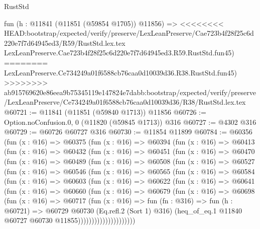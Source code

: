 \begin{lexlean}{RustStd}
\begin{coremodule}
{\begin{coremodule}
{{{{{{{{{{{{{{{{{{{{{{{{{{{{{{{{{{{{{{{{{{{{{{{{{{    fun (h : @11841 (@11851 (@59854 @1705)) @11856) =>
<<<<<<<< HEAD:bootstrap/expected/verify/preserve/LexLeanPreserve/Cae723b4f28f25c6d220e7f7d64945ed3/R59/RustStd.lex.tex
    LexLeanPreserve.Cae723b4f28f25c6d220e7f7d64945ed3.R59.RustStd.fun45)
========
    LexLeanPreserve.Ce734249a01f6588cb76caa0d10039d36.R38.RustStd.fun45)
>>>>>>>> ab915769620e86eea9b75345119e147824e7dabb:bootstrap/expected/verify/preserve/LexLeanPreserve/Ce734249a01f6588cb76caa0d10039d36/R38/RustStd.lex.tex
@60721 := @11841 (@11851 (@59840 @1713)) @11856
@60726 := Option.noConfusion.{0, 0} (@11820 (@59845 @1713)) @316
@60727 := @4302 @316
@60729 := @60726 @60727 @316
@60730 := @11854 @11899
@60784 := @60356
    (fun (x : @16) =>
    @60375
      (fun (x : @16) =>
      @60394
        (fun (x : @16) =>
        @60413
          (fun (x : @16) =>
          @60432
            (fun (x : @16) =>
            @60451
              (fun (x : @16) =>
              @60470
                (fun (x : @16) =>
                @60489
                  (fun (x : @16) =>
                  @60508
                    (fun (x : @16) =>
                    @60527
                      (fun (x : @16) =>
                      @60546
                        (fun (x : @16) =>
                        @60565
                          (fun (x : @16) =>
                          @60584
                            (fun (x : @16) =>
                            @60603
                              (fun (x : @16) =>
                              @60622
                                (fun (x : @16) =>
                                @60641
                                  (fun (x : @16) =>
                                  @60660
                                    (fun (x : @16) =>
                                    @60679
                                      (fun (x : @16) =>
                                      @60698
                                        (fun (x : @16) =>
                                        @60717
                                          (fun (x : @16) =>
                                          fun (fn : @316) =>
                                          fun (h : @60721) =>
                                          @60729
                                            @60730
                                            (Eq.refl.{2} (Sort 1) @316)
                                            (heq_of_eq.{1}
                                              @11840
                                              @60727
                                              @60730
                                              @11855)))))))))))))))))))))
}}}}}}}}}}}}}}}}}}}}}}}}}}}}}}}}}}}}}}}}}}}}}}}}}}
\end{coremodule}}
\end{coremodule}
\end{lexlean}
